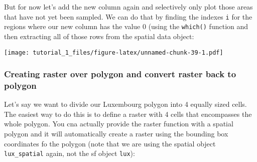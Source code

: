 \documentclass[]{article}
\newenvironment{Shaded}{\begin{snugshade}}{\end{snugshade}}
\newcommand{\DataTypeTok}[1]{\textcolor[rgb]{0.13,0.29,0.53}{#1}}
\newcommand{\DecValTok}[1]{\textcolor[rgb]{0.00,0.00,0.81}{#1}}
\newcommand{\KeywordTok}[1]{\textcolor[rgb]{0.13,0.29,0.53}{\textbf{#1}}}
\newcommand{\NormalTok}[1]{#1}
\newcommand{\OperatorTok}[1]{\textcolor[rgb]{0.81,0.36,0.00}{\textbf{#1}}}
\newcommand{\OtherTok}[1]{\textcolor[rgb]{0.56,0.35,0.01}{#1}}
\newcommand{\StringTok}[1]{\textcolor[rgb]{0.31,0.60,0.02}{#1}}
\begin{document}
\begin{Shaded}
\end{Shaded}

But for now let's add the new column again and selectively only plot
those areas that have not yet been sampled. We can do that by finding
the indexes \texttt{i} for the regions where our new column has the
value 0 (using the \texttt{which()} function and then extracting all of
those rows from the spatial data object:

\begin{Shaded}
\end{Shaded}

\texttt{[image: tutorial\_1\_files/figure-latex/unnamed-chunk-39-1.pdf]}

\hypertarget{creating-raster-over-polygon-and-convert-raster-back-to-polygon}{%
\subsubsection{Creating raster over polygon and convert raster back to
polygon}\label{creating-raster-over-polygon-and-convert-raster-back-to-polygon}}

Let's say we want to divide our Luxembourg polygon into 4 equally sized
cells. The easiest way to do this is to define a raster with 4 cells
that encompasses the whole polygon. You cna actually provide the raster
function with a spatial polygon and it will automatically create a
raster using the bounding box coordinates fo the polygon (note that we
are using the spatial object \texttt{lux\_spatial} again, not the sf
object \texttt{lux}):
\end{document}
